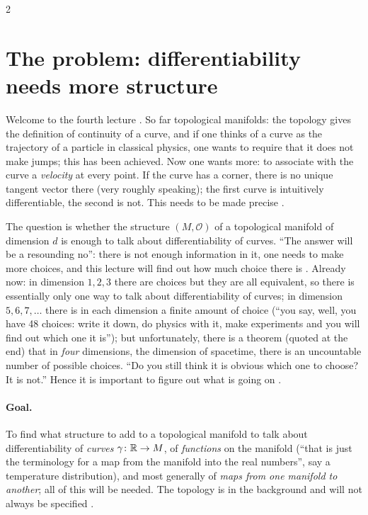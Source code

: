 \begin{paracol}{2}
\section{The problem: differentiability needs more structure}\label{sec:c04-problem}

Welcome to the fourth lecture . So far topological manifolds: the topology gives the definition of continuity of a curve, and if one thinks of a curve as the trajectory of a particle in classical physics, one wants to require that it does not make jumps; this has been achieved.
Now one wants more: to associate with the curve a \emph{velocity} at every point. If the curve has a corner, there is no unique tangent vector there (very roughly speaking); the first curve is intuitively differentiable, the second is not. This needs to be made precise
.

The question is whether the structure $(M,\mathcal O)$ of a topological manifold of dimension $d$ is enough to talk about differentiability of curves. ``The answer will be a resounding no'': there is not enough information in it, one needs to make more choices, and this lecture
will find out how much choice there is .
Already now: in dimension $1,2,3$ there are choices but they are all equivalent, so there is essentially only one way to talk about differentiability of curves; in dimension $5,6,7,\dots$ there is in each dimension a finite amount of choice (``you say, well, you have 48 choices: write it down,
do physics with it, make experiments and you will find out which one it is''); but unfortunately, there is a theorem (quoted at the end) that in \emph{four} dimensions, the dimension of spacetime, there is an uncountable number of possible choices. ``Do you still think it is obvious which one to choose? It is not.''
Hence it is important to figure out what is going on .

\paragraph{Goal.} To find what structure to add to a topological manifold to talk about differentiability of \emph{curves} $\gamma\colon\mathbb{R}\to M$, of \emph{functions} on the manifold (``that is just the terminology for a map from the manifold into the real numbers'', say a temperature distribution), and most
generally of \emph{maps from one manifold to another}; all of this will be needed. The topology is in the background and will not always be specified .


\end{paracol}
